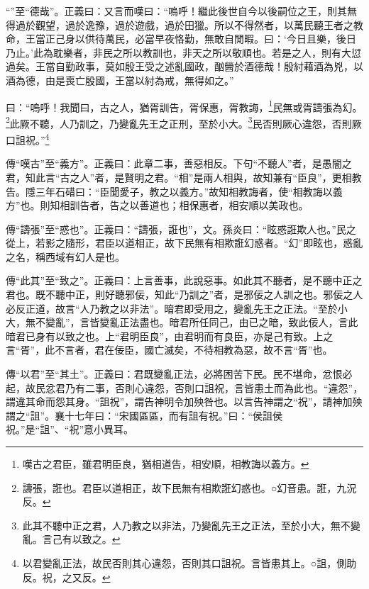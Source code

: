 {\noindent\shu{}\fzkt “”至“德哉”。正義曰：又言而嘆曰：“嗚呼！繼此後世自今以後嗣位之王，則其無得過於觀望，過於逸豫，過於遊戲，過於田獵。所以不得然者，以萬民聽王者之教命，王當正己身以供待萬民，必當早夜恪勤，無敢自閒暇。曰：‘今日且樂，後日乃止。’此為耽樂者，非民之所以教訓也，非天之所以敬順也。若是之人，則有大愆過矣。王當自勤政事，莫如殷王受之述亂國政，酗醟於酒德哉！殷紂藉酒為兇，以酒為德，由是喪亡殷國，王當以紂為戒，無得如之。” \par}

曰：“嗚呼！我聞曰，古之人，猶胥訓告，胥保惠，胥教誨，\footnote{嘆古之君臣，雖君明臣良，猶相道告，相安順，相教誨以義方。}民無或胥譸張為幻。\footnote{譸張，誑也。君臣以道相正，故下民無有相欺誑幻惑也。○幻音患。誑，九況反。}此厥不聽，人乃訓之，乃變亂先王之正刑，至於小大。\footnote{此其不聽中正之君，人乃教之以非法，乃變亂先王之正法，至於小大，無不變亂。言己有以致之。}民否則厥心違怨，否則厥口詛祝。”\footnote{以君變亂正法，故民否則其心違怨，否則其口詛祝。言皆患其上。○詛，側助反。祝，之又反。}


{\noindent\zhuan{}\fzbyks 傳“嘆古”至“義方”。正義曰：此章二事，善惡相反。下句“不聽人”者，是愚闇之君，知此言“古之人”者，是賢明之君。“相”是兩人相與，故知兼有“臣良”，更相教告。隱三年石碏曰：“臣聞愛子，教之以義方。”故知相教誨者，使“相教誨以義方”也。則知相訓告者，告之以善道也；相保惠者，相安順以美政也。 \par}

{\noindent\zhuan{}\fzbyks 傳“譸張”至“惑也”。正義曰：“譸張，誑也”，文。孫炎曰：“眩惑誑欺人也。”民之從上，若影之隨形，君臣以道相正，故下民無有相欺誑幻惑者。“幻”即眩也，惑亂之名，稱西域有幻人是也。 \par}

{\noindent\zhuan{}\fzbyks 傳“此其”至“致之”。正義曰：上言善事，此說惡事。如此其不聽者，是不聽中正之君也。既不聽中正，則好聽邪佞，知此“乃訓之”者，是邪佞之人訓之也。邪佞之人必反正道，故言“人乃教之以非法”。暗君即受用之，變亂先王之正法。“至於小大，無不變亂”，言皆變亂正法盡也。暗君所任同己，由已之暗，致此佞人，言此暗君已身有以致之也。上“君明臣良”，由君明而有良臣，亦是己有致。上之言“胥”，此不言者，君在佞臣，國亡滅矣，不待相教為惡，故不言“胥”也。 \par}

{\noindent\zhuan{}\fzbyks 傳“以君”至“其土”。正義曰：君既變亂正法，必將困苦下民。民不堪命，忿恨必起，故民忿君乃有二事，否則心違怨，否則口詛祝，言皆患土而為此也。“違怨”，謂違其命而怨其身。“詛祝”，謂告神明令加殃咎也。以言告神謂之“祝”，請神加殃謂之“詛”。襄十七年曰：“宋國區區，而有詛有祝。”曰：“侯詛侯祝。”是“詛”、“祝”意小異耳。 \par}

